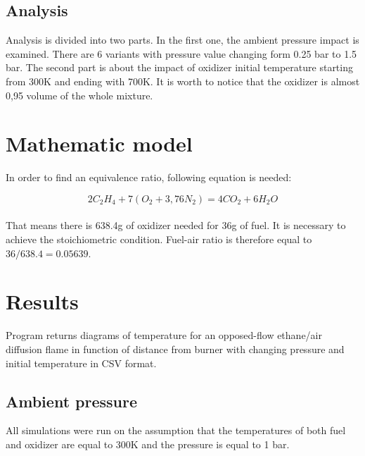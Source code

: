 \documentclass[a4paper]{article}
\newcommand{\sepspace}{\vspace*{1em}}
\begin{document}
\subsection{Analysis}
Analysis is divided into two parts. In the first one, the ambient pressure impact is examined. There are 6 variants with pressure value changing form 0.25 bar to 1.5 bar. The second part is about the impact of oxidizer initial temperature starting from 300K and ending with 700K. It is worth to notice that the oxidizer is almost 0,95 volume of the whole mixture.

\sepspace
\sepspace
\section{Mathematic model}

In order to find an equivalence ratio, following equation is needed:

\[{2C_2H_4 +7(O_2+3,76N_2) }
      = {4CO_2+6H_2 O}\] 
\\
That means there is 638.4g of oxidizer needed for 36g of fuel. It is necessary to achieve the stoichiometric condition. Fuel-air ratio is therefore equal to $36/638.4=0.05639$.

\sepspace
\sepspace
\section{Results}
Program returns diagrams of temperature for an opposed-flow ethane/air diffusion flame in function of distance from burner with changing pressure and initial temperature in CSV format.
\pagebreak


\subsection{Ambient pressure}


All simulations were run on the assumption that the temperatures of both fuel and oxidizer are equal to 300K and the pressure is equal to 1 bar. 
\end{document}
